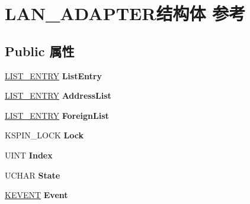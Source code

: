 \hypertarget{struct_l_a_n___a_d_a_p_t_e_r}{}\section{L\+A\+N\+\_\+\+A\+D\+A\+P\+T\+E\+R结构体 参考}
\label{struct_l_a_n___a_d_a_p_t_e_r}
\subsection*{Public 属性}
\begin{DoxyCompactItemize}
\item 
\mbox{\label{struct_l_a_n___a_d_a_p_t_e_r_ab60979cbf6254b2ff518e8bcb4ddcbdf}} 
\hyperlink{struct___l_i_s_t___e_n_t_r_y}{L\+I\+S\+T\+\_\+\+E\+N\+T\+RY} {\bfseries List\+Entry}
\item 
\mbox{\label{struct_l_a_n___a_d_a_p_t_e_r_a7304535186cefec230f71f2bf8593fce}} 
\hyperlink{struct___l_i_s_t___e_n_t_r_y}{L\+I\+S\+T\+\_\+\+E\+N\+T\+RY} {\bfseries Address\+List}
\item 
\mbox{\label{struct_l_a_n___a_d_a_p_t_e_r_a25486868e48c7ea9c9383ed84b467360}} 
\hyperlink{struct___l_i_s_t___e_n_t_r_y}{L\+I\+S\+T\+\_\+\+E\+N\+T\+RY} {\bfseries Foreign\+List}
\item 
\mbox{\label{struct_l_a_n___a_d_a_p_t_e_r_a679fe127ee11d1efac0fd9d3fde2a29a}} 
K\+S\+P\+I\+N\+\_\+\+L\+O\+CK {\bfseries Lock}
\item 
\mbox{\label{struct_l_a_n___a_d_a_p_t_e_r_a9d0034392d01b3cff4f135120b5faf6b}} 
U\+I\+NT {\bfseries Index}
\item 
\mbox{\label{struct_l_a_n___a_d_a_p_t_e_r_a90242518073c2c6b97f6fbbb8d2ad3fd}} 
U\+C\+H\+AR {\bfseries State}
\item 
\mbox{\label{struct_l_a_n___a_d_a_p_t_e_r_a7e273c404a7938545f6e7af4caf84103}} 
\hyperlink{struct___k_e_v_e_n_t}{K\+E\+V\+E\+NT} {\bfseries Event}
\item 
\mbox{\label{struct_l_a_n___a_d_a_p_t_e_r_a4740ebd7f1adbeeddfe3e5206ee90c87}} 

\end{DoxyCompactItemize}
